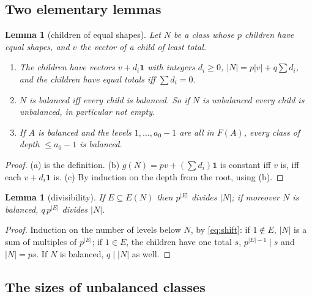\documentclass[11pt,a4paper]{amsart}
\newtheorem{lemma}[theorem]{Lemma}
\theoremstyle{definition}
\theoremstyle{remark}
\newcommand{\one}{\mathbf{1}}
\begin{document}
\subsection{Two elementary lemmas}

\begin{lemma}[children of equal shapes]\label{lem:shapes}
Let $N$ be a class whose $p$ children have equal shapes, and $v$ the vector of a child of least total.
\begin{enumerate}
\item[(a)] The children have vectors $v+d_i\one$ with integers $d_i\ge0$, $|N|=p|v|+q\sum d_i$, and the
children have equal totals iff $\sum d_i=0$.
\item[(b)] $N$ is balanced iff every child is balanced. So if $N$ is unbalanced every child is unbalanced, in
particular not empty.
\item[(c)] If $A$ is balanced and the levels $1,\dots,a_0-1$ are all in $F(A)$, every class of depth
$\le a_0-1$ is balanced.
\end{enumerate}
\end{lemma}
\begin{proof}
(a) is the definition. (b) $g(N)=pv+(\sum d_i)\one$ is constant iff $v$ is, iff each $v+d_i\one$ is.
(c) By induction on the depth from the root, using (b).
\end{proof}

\begin{lemma}[divisibility]\label{lem:div}
If $E\subseteq E(N)$ then $p^{|E|}$ divides $|N|$; if moreover $N$ is balanced, $q\,p^{|E|}$ divides $|N|$.
\end{lemma}
\begin{proof}
Induction on the number of levels below $N$, by \eqref{eq:shift}: if $1\notin E$, $|N|$ is a sum of multiples
of $p^{|E|}$; if $1\in E$, the children have one total $s$, $p^{|E|-1}\mid s$ and $|N|=ps$. If $N$ is
balanced, $q\mid |N|$ as well.
\end{proof}

\subsection{The sizes of unbalanced classes}
\end{document}
